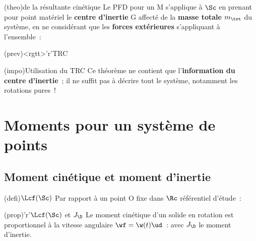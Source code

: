\documentclass[../../main/main.tex]{subfiles}
\begin{document}
\begin{tcbraster}[raster columns=2, raster equal height=rows, raster
		valign=top]%
	\begin{tcb*}(theo){de la résultante cinétique}
		Le PFD pour un M s'applique à $\Sc$ en prenant pour point matériel le
		\textbf{centre d'inertie} G affecté de la \textbf{masse totale} $m_{\tot}$
		du système, en ne considérant que les \textbf{forces extérieures}
		s'appliquant à l'ensemble~:
		\psw{
			\[
				\boxed{\dv{\pf\Rg(\Sc)}{t} = m_{\tot}\dv{\vf(\Gr)}{t} = \Ff_{\ext}}
			\]
		}
		\vspace{-15pt}
	\end{tcb*}%
	\begin{tcb*}(prev)<rgtt>'r'{TRC}
	\end{tcb*}
\end{tcbraster}
\begin{tcb*}(impo){Utilisation du TRC}
	Ce théorème ne contient que l'\textbf{information du centre d'inertie}~; il ne
	suffit pas à décrire tout le système, notamment les rotations pures~!
\end{tcb*}

\section{Moments pour un système de points}
\subsection{Moment cinétique et moment d'inertie}
\begin{tcbraster}[raster equal height=rows, raster columns=2]
	\begin{tcb*}(defi){$\protect\Lcf(\Sc)$}
		Par rapport à un point O fixe dans $\Rc$ référentiel d'étude~:
		\psw{
			\[
				\boxed{\Lcf_{\Or}(\Sc) = \sum_i\Lcf_{\Or}(\Mr_i)
					= \sum_i \OM_i\wedge\pf\Rg(\Mr_i)}
			\]
		}
	\end{tcb*}
	\begin{tcb*}(prop)'r'{$\protect\Lcf(\Sc)$ et $J_{\D}$}
		Le moment cinétique d'un solide en rotation est proportionnel à la vitesse
		angulaire $\wf = \w(t)\ud$~:
		\psw{
			\[
				\boxed{
					\Lcf_{\Or} = J_{\D}\wf
					\Lra
					\Lc_{\D} = J_{\D}\w
				}
			\]
		}%
		avec $J_{\D}$ le moment d'inertie.
	\end{tcb*}
\end{tcbraster}
\end{document}
